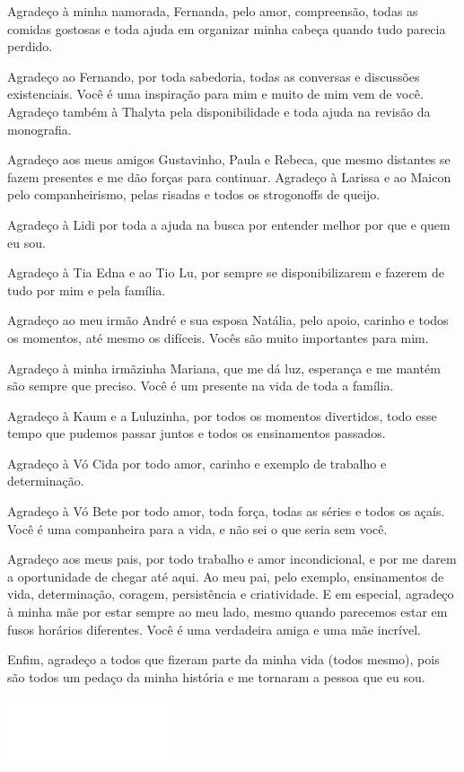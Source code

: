 \documentclass[12pt,a4paper]{report}
\begin{document}
Agradeço à minha namorada, Fernanda, pelo amor, compreensão, todas as comidas gostosas e toda ajuda em organizar
minha cabeça quando tudo parecia perdido.

Agradeço ao Fernando, por toda sabedoria, todas as conversas e discussões existenciais. Você é uma inspiração
para mim e muito de mim vem de você. Agradeço também à Thalyta pela disponibilidade e toda ajuda na revisão da
monografia.

Agradeço aos meus amigos Gustavinho, Paula e Rebeca, que mesmo distantes se fazem presentes e me dão forças
para continuar. Agradeço à Larissa e ao Maicon pelo companheirismo, pelas risadas e todos os strogonoffs de
queijo.

Agradeço à Lidi por toda a ajuda na busca por entender melhor por que e quem eu sou.

Agradeço à Tia Edna e ao Tio Lu, por sempre se disponibilizarem e fazerem de tudo por mim e pela família.

Agradeço ao meu irmão André e sua esposa Natália, pelo apoio, carinho e todos os momentos, até mesmo os
difíceis. Vocês são muito importantes para mim.

Agradeço à minha irmãzinha Mariana, que me dá luz, esperança e me mantém são sempre que preciso. Você é um
presente na vida de toda a família.

Agradeço à Kaum e a Luluzinha, por todos os momentos divertidos, todo esse tempo que pudemos passar juntos
e todos os ensinamentos passados.

Agradeço à Vó Cida por todo amor, carinho e exemplo de trabalho e determinação.

Agradeço à Vó Bete por todo amor, toda força, todas as séries e todos os açaís. Você é uma companheira para a
vida, e não sei o que seria sem você.

Agradeço aos meus pais, por todo trabalho e amor incondicional, e por me darem a oportunidade de chegar até
aqui. Ao meu pai, pelo exemplo, ensinamentos de vida, determinação, coragem, persistência e criatividade. E em
especial, agradeço à minha mãe por estar sempre ao meu lado, mesmo quando parecemos estar em fusos horários
diferentes. Você é uma verdadeira amiga e uma mãe incrível.

Enfim, agradeço a todos que fizeram parte da minha vida (todos mesmo), pois são todos um pedaço da minha
história e me tornaram a pessoa que eu sou.

\thispagestyle{empty}
\clearpage

\begin{minipage}{0.49\linewidth}
  \includegraphics[scale=0.01]{images/branco} 
\end{minipage}\\[18cm]
\end{document}
